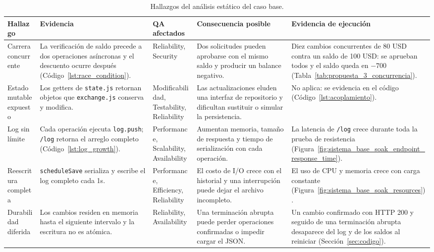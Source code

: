     \begin{table}[H]
        \centering
        \small
        \setlength{\tabcolsep}{4pt}
        \renewcommand{\arraystretch}{1.2}
        \caption{Hallazgos del análisis estático del caso base.}
        \label{tab:hallazgos_codigo_base}
        \begin{tabular}{@{}>{\raggedright\hyphenpenalty=10000\exhyphenpenalty=10000\arraybackslash}p{}p{}>{\raggedright\hyphenpenalty=10000\exhyphenpenalty=10000\arraybackslash}p{}p{}p{}@{}}
            \toprule
            \textbf{Hallazgo} & \textbf{Evidencia} & \textbf{QA afectados} & \textbf{Consecuencia posible} & \textbf{Evidencia de ejecución} \\
            \midrule
            Carrera concurrente & La verificación de saldo precede a dos operaciones asíncronas y el descuento ocurre después (Código~\ref{lst:race_condition}). & Reliability, Security & Dos solicitudes pueden aprobarse con el mismo saldo y producir un balance negativo. & Diez cambios concurrentes de 80 USD contra un saldo de 100 USD: se aprueban todos y el saldo queda en $-700$ (Tabla~\ref{tab:propuesta_3_concurrencia}). \\
            \midrule
            Estado mutable expuesto & Los getters de \texttt{state.js} retornan objetos que \texttt{exchange.js} conserva y modifica. & Modificabilidad, Testability, Reliability & Las actualizaciones eluden una interfaz de repositorio y dificultan sustituir o simular la persistencia. & No aplica: se evidencia en el código (Código~\ref{lst:acoplamiento}). \\
            \midrule
            Log sin límite & Cada operación ejecuta \texttt{log.push}; \texttt{/log} retorna el arreglo completo (Código~\ref{lst:log_growth}). & Performance, Scalability, Availability & Aumentan memoria, tamaño de respuesta y tiempo de serialización con cada operación. & La latencia de \texttt{/log} crece durante toda la prueba de resistencia (Figura~\ref{fig:sistema_base_soak_endpoint_response_time}). \\
            \midrule
            Reescritura completa & \texttt{scheduleSave} serializa y escribe el log completo cada 1s. & Performance, Efficiency, Reliability & El costo de I/O crece con el historial y una interrupción puede dejar el archivo incompleto. & El uso de CPU y memoria crece con carga constante (Figura~\ref{fig:sistema_base_soak_resources}). \\
            \midrule
            Durabilidad diferida & Los cambios residen en memoria hasta el siguiente intervalo y la escritura no es atómica. & Reliability, Availability & Una terminación abrupta puede perder operaciones confirmadas o impedir cargar el JSON. & Un cambio confirmado con HTTP 200 y seguido de una terminación abrupta desaparece del log y de los saldos al reiniciar (Sección~\ref{sec:codigo}). \\

\end{tabular}
\end{table}
